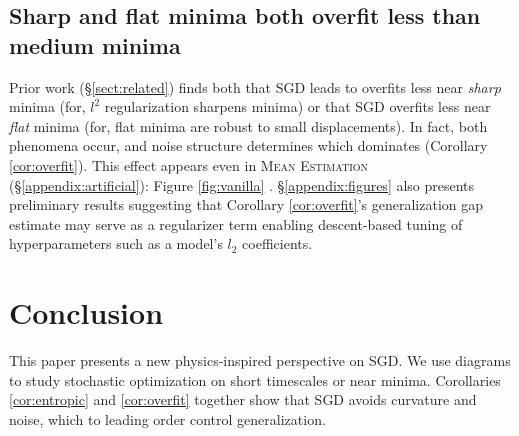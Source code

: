 \documentclass[anon,12pt]{colt2021} %
\newcommand{\ofsix}[1]{
    {\tiny \raisebox{0.04cm}{$\substack{
        \ifthenelse{\equal{#1}{0}}{{\color{moor}\blacksquare}}{\square}
        \ifthenelse{\equal{#1}{2}}{{\color{moor}\blacksquare}}{\square}    
        \ifthenelse{\equal{#1}{4}}{{\color{moor}\blacksquare}}{\square} \\
        \ifthenelse{\equal{#1}{1}}{{\color{moor}\blacksquare}}{\square}    
        \ifthenelse{\equal{#1}{3}}{{\color{moor}\blacksquare}}{\square}
        \ifthenelse{\equal{#1}{5}}{{\color{moor}\blacksquare}}{\square}
    }$}}%
}
\newcommand{\MeanEstimation}{\textsc{Mean Estimation}}
\begin{document}
            \newpage
        \subsection{Sharp and flat minima both overfit less than medium minima} \label{subsect:overfit}
    
            Prior work (\S\ref{sect:related}) finds both that SGD leads to
            overfits less near \emph{sharp} minima (for, $l^2$ regularization
            sharpens minima) or that SGD overfits less near \emph{flat} minima
            (for, flat minima are robust to small displacements).  In fact,
            both phenomena occur, and noise structure determines which
            dominates (Corollary \ref{cor:overfit}).  This effect appears even
            in \MeanEstimation\, (\S\ref{appendix:artificial}): Figure
            \ref{fig:vanilla}\ofsix{5}.
            \S\ref{appendix:figures} also presents preliminary results
            suggesting that Corollary \ref{cor:overfit}'s generalization gap
            estimate may serve as a regularizer term enabling descent-based
            tuning of hyperparameters such as a model's $l_2$ coefficients.
            
            
            \vfill
    \section{Conclusion}



            This paper presents a new physics-inspired perspective on SGD.  We
            use diagrams to study stochastic optimization on short timescales
            or near minima.  Corollaries \ref{cor:entropic} and
            \ref{cor:overfit} together show that SGD avoids curvature and
            noise, which to leading order control generalization.
\end{document}
